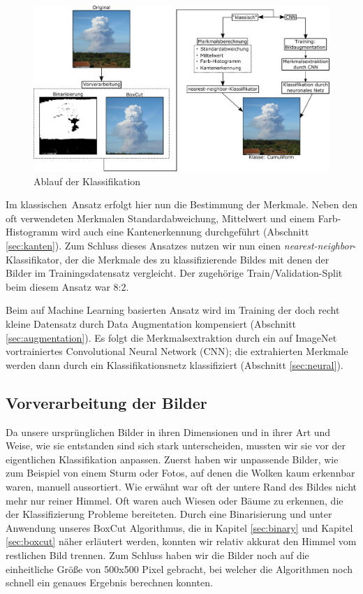 \documentclass[a4,german]{article}
\begin{document}
\begin{figure}
	\centering
	\includegraphics[height=0.25\paperheight]{Ablauf.pdf}
	\caption{Ablauf der Klassifikation}
	\label{fig:ablauf}
\end{figure}

Im \glqq klassischen\grqq\ Ansatz erfolgt hier nun die Bestimmung der Merkmale.
Neben den oft verwendeten Merkmalen Standardabweichung, Mittelwert und einem Farb-Histogramm wird auch eine Kantenerkennung durchgeführt (Abschnitt \ref{sec:kanten}).
Zum Schluss dieses Ansatzes nutzen wir nun einen \emph{nearest-neighbor}-Klassifikator, der die Merkmale des zu klassifizierende Bildes mit denen der Bilder im Trainingsdatensatz vergleicht.
Der zugehörige Train/Validation-Split beim diesem Ansatz war 8:2. %

Beim auf Machine Learning basierten Ansatz wird im Training der doch recht kleine Datensatz durch Data Augmentation kompensiert (Abschnitt \ref{sec:augmentation}).
Es folgt die Merkmalsextraktion durch ein auf ImageNet vortrainiertes Convolutional Neural Network (CNN); die extrahierten Merkmale werden dann durch ein Klassifikationsnetz klassifiziert (Abschnitt \ref{sec:neural}).


\subsection{Vorverarbeitung der Bilder}
\label{sec:vorverarbeitung}
Da unsere ursprünglichen Bilder in ihren Dimensionen und in ihrer Art und Weise, wie sie entstanden sind sich stark unterscheiden, mussten wir sie vor der eigentlichen Klassifikation anpassen.
Zuerst haben wir unpassende Bilder, wie zum Beispiel von einem Sturm oder Fotos, auf denen die Wolken kaum erkennbar waren, manuell aussortiert.
Wie erwähnt war oft der untere Rand des Bildes nicht mehr nur reiner Himmel. Oft waren auch Wiesen oder Bäume zu erkennen, die der Klassifizierung Probleme bereiteten.
Durch eine Binarisierung und unter Anwendung unseres BoxCut Algorithmus, die in Kapitel \ref{sec:binary} und Kapitel \ref{sec:boxcut} näher erläutert werden, konnten wir relativ akkurat den Himmel vom restlichen Bild trennen.
Zum Schluss haben wir die Bilder noch auf die einheitliche Größe von 500x500 Pixel gebracht, bei welcher die Algorithmen noch schnell ein genaues Ergebnis berechnen konnten.
\end{document}
